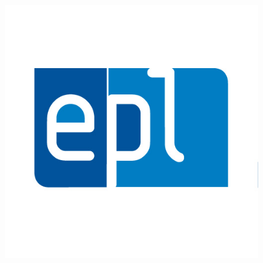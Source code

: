 \begin{titlepage}
\begin{figure}[b]
\begin{minipage}{0.2\linewidth}
\end{minipage} \hspace{-10pt}
\begin{minipage}{0.2\linewidth}
\centering
    \includegraphics[scale=0.2]{images/logo_epl.jpg}
\end{minipage}
\end{figure}
\end{titlepage}
\restoregeometry
